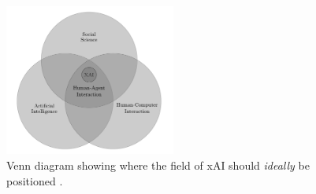 \begin{figure}[htbp]
\centerline{\includegraphics[width=0.5\textwidth]{literature-review/images/xai-position}}
\caption{Venn diagram showing where the field of xAI should \textit{ideally} be positioned \citep{miller2018explanation}.}
\label{fig:xai-position}
\end{figure}

